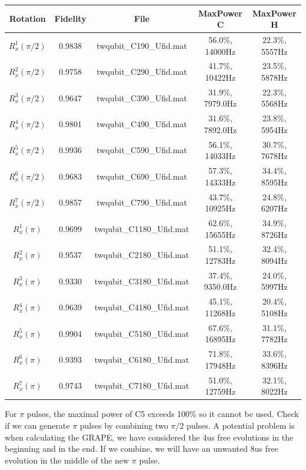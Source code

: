 \documentclass[prl,onecolumn]{revtex4-1}
\begin{document}
\begin{table}[hbtp]
\begin{tabular} {c||c|c|c|c}
  \hline
  Rotation & Fidelity & File & MaxPower C & MaxPower H\\
  \hline
  $R_x^1(\pi/2)$ & 0.9838 & twqubit\_C190\_Ufid.mat & 56.0\%, 14000Hz & 22.3\%, 5557Hz\\
  $R_x^2(\pi/2)$ & 0.9758 & twqubit\_C290\_Ufid.mat & 41.7\%, 10422Hz & 23.5\%, 5878Hz\\
  $R_x^3(\pi/2)$ & 0.9647 & twqubit\_C390\_Ufid.mat & 31.9\%, 7979.0Hz & 22.3\%, 5568Hz\\
  $R_x^4(\pi/2)$ & 0.9801 & twqubit\_C490\_Ufid.mat & 31.6\%, 7892.0Hz & 23.8\%, 5954Hz\\
  $R_x^5(\pi/2)$ & 0.9936 & twqubit\_C590\_Ufid.mat & 56.1\%, 14033Hz & 30.7\%, 7678Hz\\
  $R_x^6(\pi/2)$ & 0.9683 & twqubit\_C690\_Ufid.mat & 57.3\%, 14333Hz & 34.4\%, 8595Hz\\
  $R_x^7(\pi/2)$ & 0.9857 & twqubit\_C790\_Ufid.mat & 43.7\%, 10925Hz & 24.8\%, 6207Hz\\
  \hline
  \hline
  $R_x^1(\pi)$ & 0.9699 & twqubit\_C1180\_Ufid.mat & 62.6\%, 15655Hz & 34.9\%, 8726Hz\\
  $R_x^2(\pi)$ & 0.9537 & twqubit\_C2180\_Ufid.mat & 51.1\%, 12783Hz & 32.4\%, 8094Hz\\
  $R_x^3(\pi)$ & 0.9330 & twqubit\_C3180\_Ufid.mat & 37.4\%, 9350.0Hz & 24.0\%, 5997Hz\\
  $R_x^4(\pi)$ & 0.9639 & twqubit\_C4180\_Ufid.mat & 45.1\%, 11268Hz & 20.4\%, 5108Hz\\
  $R_x^5(\pi)$ & 0.9904 & twqubit\_C5180\_Ufid.mat & 67.6\%, 16895Hz & 31.1\%, 7782Hz\\
  $R_x^6(\pi)$ & 0.9393 & twqubit\_C6180\_Ufid.mat & 71.8\%, 17948Hz & 33.6\%, 8396Hz\\
  $R_x^7(\pi)$ & 0.9743 & twqubit\_C7180\_Ufid.mat & 51.0\%, 12759Hz & 32.1\%, 8022Hz\\
  \hline
\end{tabular}
\end{table}

For $\pi$ pulses, the maximal power of C5 exceeds 100\% so it cannot be used. Check if we can generate $\pi$ pulses by combining two $\pi/2$ pulses. A potential problem is when calculating the GRAPE, we have considered the 4us free evolutions in the beginning and in the end. If we combine, we will have an unwanted 8us free evolution in the middle of the new $\pi$ pulse.
\end{document}
